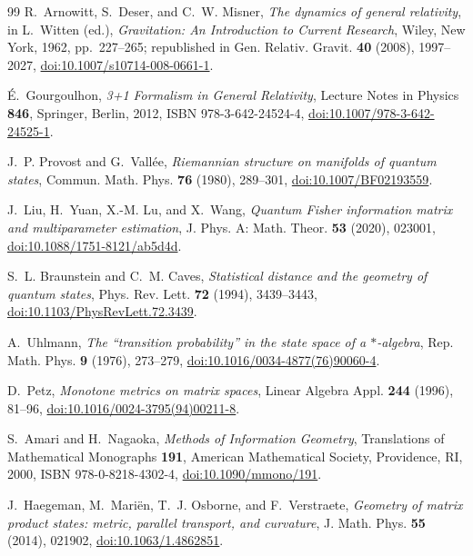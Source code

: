 \documentclass[11pt,a4paper,reqno]{amsart}
\theoremstyle{definition}
\numberwithin{equation}{section}
\begin{document}
\begin{thebibliography}{99}
R.~Arnowitt, S.~Deser, and C.~W. Misner,
\emph{The dynamics of general relativity},
in L.~Witten (ed.), \emph{Gravitation: An Introduction to Current Research}, Wiley, New York, 1962, pp.~227--265;
republished in Gen. Relativ. Gravit. \textbf{40} (2008), 1997--2027,
\href{https://doi.org/10.1007/s10714-008-0661-1}{doi:10.1007/s10714-008-0661-1}.

\'E.~Gourgoulhon,
\emph{3+1 Formalism in General Relativity},
Lecture Notes in Physics \textbf{846}, Springer, Berlin, 2012, ISBN 978-3-642-24524-4,
\href{https://doi.org/10.1007/978-3-642-24525-1}{doi:10.1007/978-3-642-24525-1}.

J.~P. Provost and G.~Vall\'ee,
\emph{Riemannian structure on manifolds of quantum states},
Commun. Math. Phys. \textbf{76} (1980), 289--301,
\href{https://doi.org/10.1007/BF02193559}{doi:10.1007/BF02193559}.

J.~Liu, H.~Yuan, X.-M. Lu, and X.~Wang,
\emph{Quantum Fisher information matrix and multiparameter estimation},
J. Phys. A: Math. Theor. \textbf{53} (2020), 023001,
\href{https://doi.org/10.1088/1751-8121/ab5d4d}{doi:10.1088/1751-8121/ab5d4d}.

S.~L. Braunstein and C.~M. Caves,
\emph{Statistical distance and the geometry of quantum states},
Phys. Rev. Lett. \textbf{72} (1994), 3439--3443,
\href{https://doi.org/10.1103/PhysRevLett.72.3439}{doi:10.1103/PhysRevLett.72.3439}.

A.~Uhlmann,
\emph{The ``transition probability'' in the state space of a $*$-algebra},
Rep. Math. Phys. \textbf{9} (1976), 273--279,
\href{https://doi.org/10.1016/0034-4877(76)90060-4}{doi:10.1016/0034-4877(76)90060-4}.

D.~Petz,
\emph{Monotone metrics on matrix spaces},
Linear Algebra Appl. \textbf{244} (1996), 81--96,
\href{https://doi.org/10.1016/0024-3795(94)00211-8}{doi:10.1016/0024-3795(94)00211-8}.

S.~Amari and H.~Nagaoka,
\emph{Methods of Information Geometry},
Translations of Mathematical Monographs \textbf{191}, American Mathematical Society, Providence, RI, 2000, ISBN 978-0-8218-4302-4,
\href{https://doi.org/10.1090/mmono/191}{doi:10.1090/mmono/191}.

J.~Haegeman, M.~Mari\"en, T.~J. Osborne, and F.~Verstraete,
\emph{Geometry of matrix product states: metric, parallel transport, and curvature},
J. Math. Phys. \textbf{55} (2014), 021902,
\href{https://doi.org/10.1063/1.4862851}{doi:10.1063/1.4862851}.


\end{thebibliography}
\end{document}
